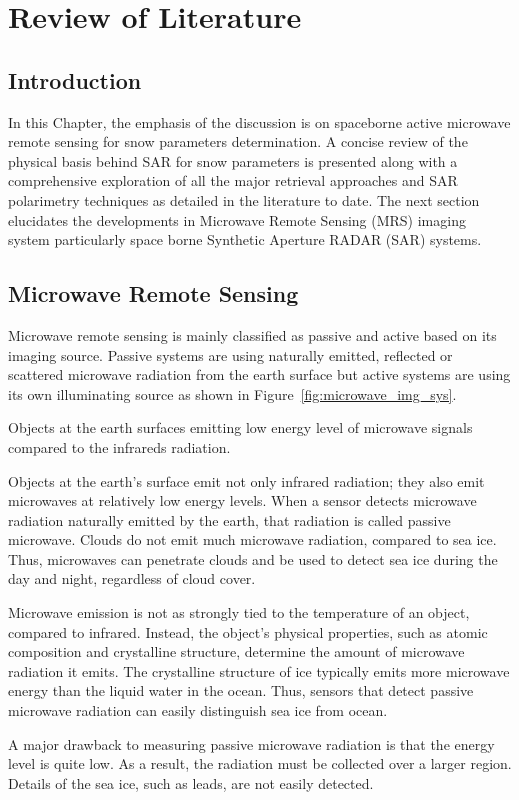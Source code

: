 \chapter{Review of Literature}
\section{Introduction}
In this Chapter, the emphasis of the discussion is on spaceborne active microwave remote sensing for snow parameters determination. A concise review of the physical basis behind SAR for snow parameters is presented along with a comprehensive exploration of all the major retrieval approaches and SAR polarimetry techniques as detailed in the literature to date. The next section elucidates the developments in Microwave Remote Sensing (MRS) imaging system particularly space borne Synthetic Aperture RADAR (SAR) systems. 
\section{Microwave Remote Sensing}
Microwave remote sensing is mainly classified as passive and active based on its imaging source. Passive systems are using naturally emitted, reflected or scattered microwave radiation from the earth surface but active systems are using its own illuminating source as shown in Figure~\ref{fig:microwave_img_sys}.

Objects at the earth surfaces emitting low energy level of microwave signals compared to the infrareds radiation.  

Objects at the earth's surface emit not only infrared radiation; they also emit microwaves at relatively low energy levels. When a sensor detects microwave radiation naturally emitted by the earth, that radiation is called passive microwave. Clouds do not emit much microwave radiation, compared to sea ice. Thus, microwaves can penetrate clouds and be used to detect sea ice during the day and night, regardless of cloud cover.

Microwave emission is not as strongly tied to the temperature of an object, compared to infrared. Instead, the object's physical properties, such as atomic composition and crystalline structure, determine the amount of microwave radiation it emits. The crystalline structure of ice typically emits more microwave energy than the liquid water in the ocean. Thus, sensors that detect passive microwave radiation can easily distinguish sea ice from ocean.

A major drawback to measuring passive microwave radiation is that the energy level is quite low. As a result, the radiation must be collected over a larger region. Details of the sea ice, such as leads, are not easily detected.

